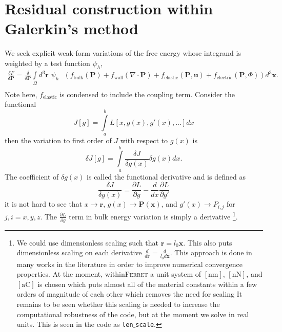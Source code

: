 \documentclass[16pt]{article} %
\begin{document}

%
\section{Residual construction within Galerkin's method}
%
We seek explicit weak-form variations of the free energy whose integrand is weighted by a test function $\psi_h$,
%
\begin{eqnarray}\nonumber
\frac{\delta F}{\delta \textbf{P} }= \frac{\delta}{\delta \textbf{P}} \int\limits_\Omega d^3 \textbf{r} \,\,\psi_h \,\,\,\,\left( f_\mathrm{bulk} (\textbf{P}) + f_\mathrm{wall} (\nabla \cdot \textbf{P}) + f_\mathrm{elastic}(\textbf{P}, \textbf{u}) + f_\mathrm{electric}(\textbf{P}, \Phi) \right)d^3 {\boldsymbol x}. \\ \nonumber
\end{eqnarray}
%
Note here, $f_\mathrm{elastic}$ is condensed to include the coupling term. Consider the functional
%
$$J[g] = \int\limits_a^b L[x, g(x), g'(x),...]dx$$
%
then the variation to first order of $J$ with respect to $g(x)$ is
%
$$\delta J[g] = \int\limits_a^b \frac{\delta J}{\delta g(x)} \delta g(x) dx.$$
%
The coefficient of $\delta g(x)$ is called the functional derivative and is defined as
%
\begin{equation}\tag{13}
\frac{\delta J}{\delta g(x)} = \frac{\partial L}{\partial g} - \frac{d}{dx} \frac{\partial L}{\partial g'}
\end{equation}
%
it is not hard to see that $x \to \textbf{r}$, $g(x) \to \textbf{P} ({\boldsymbol x})$, and $g'(x) \to P_{i,j}$ for $j,i = x,y,z$. The $\frac{\partial L}{\partial g}$ term in bulk energy variation is simply a derivative \footnote[1]{%
We could use dimensionless scaling such that $\textbf{r} = l_0 {\boldsymbol x}$.
%
This also puts dimensionless scaling on each derivative $\frac{d}{d \textbf{r}} = \frac{d}{l_0 d{\boldsymbol x}}$. 
%
This approach is done in many works in the literature \cite{Li2001, Ng2012} in order to improve numerical convergence properties.
%
At the moment, within\textsc{Ferret} a unit system of $[\mathrm{nm}]$, $[\mathrm{nN}]$, and $[\mathrm{aC}]$ is chosen which puts almost all of the material constants within a few orders of magnitude of each other which removes the need for scaling
%
It remains to be seen whether this scaling is needed to increase the computational robustness of the code, but at the moment we solve in real units. 
%
This is seen in the code as \texttt{len$\_$scale}.}. 
\end{document}

